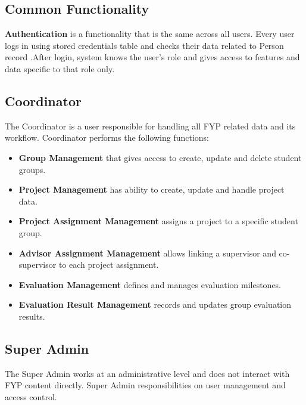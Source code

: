 \documentclass[12pt,a4paper]{report}
\begin{document}
\subsection{Common Functionality}

\textbf{Authentication} is a functionality that is the same across all users. Every user logs in using stored credentials table and checks their data related to Person record .After login, system knows the user's role and gives access to features and data specific to that role only.

\subsection{Coordinator}

The Coordinator is a user responsible for handling all FYP related data and its workflow. Coordinator performs the following functions:

\begin{itemize}
    \item \textbf{Group Management} that gives access to create, update and delete student groups.
    
    \item \textbf{Project Management} has ability to create, update and handle project data.
    
    \item \textbf{Project Assignment Management} assigns a project to a specific student group.
    
    \item \textbf{Advisor Assignment Management} allows linking a supervisor and co-supervisor to each project assignment.
    
    \item \textbf{Evaluation Management}   defines and manages evaluation milestones.
    
    \item \textbf{Evaluation Result Management} records and updates group evaluation results.
\end{itemize}

\subsection{Super Admin}

The Super Admin works at an administrative level and does not interact with FYP content directly. Super Admin responsibilities  on user management and access control.
\end{document}
